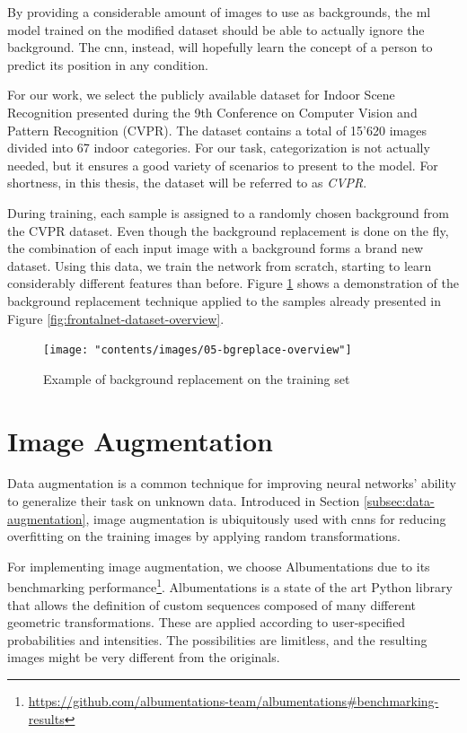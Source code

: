 By providing a considerable amount of images to use as backgrounds, the \gls{ml} model trained on the modified dataset should be able to actually ignore the background. The \gls{cnn}, instead, will hopefully learn the concept of a person to predict its position in any condition.

\medskip

For our work, we select the publicly available dataset \cite{cvpr09} for Indoor Scene Recognition presented during the 9th Conference on Computer Vision and Pattern Recognition (CVPR). The dataset contains a total of 15'620 images divided into 67 indoor categories. For our task, categorization is not actually needed, but it ensures a good variety of scenarios to present to the model. For shortness, in this thesis, the dataset will be referred to as \textit{CVPR}.

During training, each sample is assigned to a randomly chosen background from the CVPR dataset. Even though the background replacement is done on the fly, the combination of each input image with a background forms a brand new dataset. Using this data, we train the network from scratch, starting to learn considerably different features than before. Figure \ref{fig:bgreplace-example} shows a demonstration of the background replacement technique applied to the samples already presented in Figure \ref{fig:frontalnet-dataset-overview}. 

\vspace*{5ex}
\begin{figure}[!h]
	\centering
	\texttt{[image: "contents/images/05-bgreplace-overview"]}
	\caption[Example of background replacement on the training set]{Example of background replacement on the training set}
	\label{fig:bgreplace-example}
\end{figure}
\clearpage




\section{Image Augmentation}
\label{sec:implementation-imgaug}

Data augmentation is a common technique for improving neural networks' ability to generalize their task on unknown data. Introduced in Section \ref{subsec:data-augmentation}, image augmentation is ubiquitously used with \gls{cnn}s for reducing overfitting on the training images by applying random transformations.

For implementing image augmentation, we choose Albumentations \cite{Buslaev_2020} due to its benchmarking performance\footnote{\url{https://github.com/albumentations-team/albumentations\#benchmarking-results}}. Albumentations is a state of the art Python library that allows the definition of custom sequences composed of many different geometric transformations. These are applied according to user-specified probabilities and intensities. The possibilities are limitless, and the resulting images might be very different from the originals.

